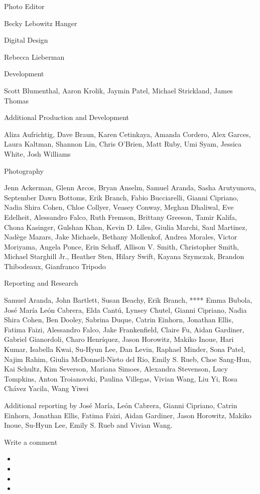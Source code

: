 Photo Editor

Becky Lebowitz Hanger

Digital Design

Rebecca Lieberman

Development

Scott Blumenthal, Aaron Krolik, Jaymin Patel, Michael Strickland, James
Thomas

Additional Production and Development

Aliza Aufrichtig, Dave Braun, Karen Cetinkaya, Amanda Cordero, Alex
Garces, Laura Kaltman, Shannon Lin, Chris O'Brien, Matt Ruby, Umi Syam,
Jessica White, Josh Williams

Photography

Jenn Ackerman, Glenn Arcos, Bryan Anselm, Samuel Aranda, Sasha
Arutyunova, September Dawn Bottoms, Erik Branch, Fabio Bucciarelli,
Gianni Cipriano, Nadia Shira Cohen, Chloe Collyer, Veasey Conway, Meghan
Dhaliwal, Eve Edelheit, Alessandro Falco, Ruth Fremson, Brittany
Greeson, Tamir Kalifa, Chona Kasinger, Gulshan Khan, Kevin D. Liles,
Giulia Marchi, Saul Martinez, Nadège Mazars, Jake Michaels, Bethany
Mollenkof, Andrea Morales, Victor Moriyama, Angela Ponce, Erin Schaff,
Allison V. Smith, Christopher Smith, Michael Starghill Jr., Heather
Sten, Hilary Swift, Kayana Szymczak, Brandon Thibodeaux, Gianfranco
Tripodo

Reporting and Research

Samuel Aranda, John Bartlett, Susan Beachy, Erik Branch, **** Emma
Bubola, José María León Cabrera, Elda Cantú, Lynsey Chutel, Gianni
Cipriano, Nadia Shira Cohen, Ben Dooley, Sabrina Duque, Catrin Einhorn,
Jonathan Ellis, Fatima Faizi, Alessandro Falco, Jake Frankenfield,
Claire Fu, Aidan Gardiner, Gabriel Gianordoli, Charo Henríquez, Jason
Horowitz, Makiko Inoue, Hari Kumar, Isabella Kwai, Su-Hyun Lee, Dan
Levin, Raphael Minder, Sona Patel, Najim Rahim, Giulia McDonnell-Nieto
del Rio, Emily S. Rueb, Choe Sang-Hun, Kai Schultz, Kim Severson,
Mariana Simoes, Alexandra Stevenson, Lucy Tompkins, Anton Troianovski,
Paulina Villegas, Vivian Wang, Liu Yi, Rosa Chávez Yacila, Wang Yiwei

Additional reporting by José María, León Cabrera, Gianni Cipriano,
Catrin Einhorn, Jonathan Ellis, Fatima Faizi, Aidan Gardiner, Jason
Horowitz, Makiko Inoue, Su-Hyun Lee, Emily S. Rueb and Vivian Wang.

Write a comment

\begin{itemize}
\item
\item
\item
\item
\end{itemize}

